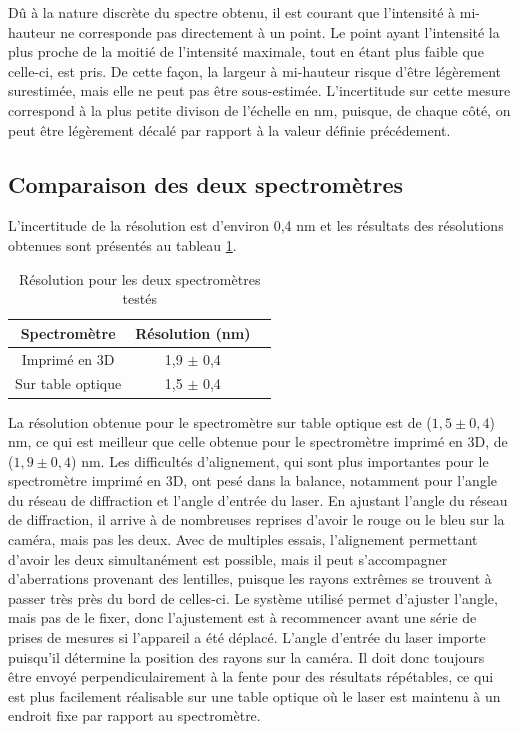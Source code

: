 \documentclass[11pt,letterpaper]{article}
\begin{document}
Dû à la nature discrète du spectre obtenu, il est courant que l'intensité à 
mi-hauteur ne corresponde pas directement à un point. Le point ayant l'intensité la plus proche
de la moitié de l'intensité maximale, tout en étant plus faible que celle-ci, est pris. De
cette façon, la largeur à mi-hauteur risque d'être légèrement surestimée, mais elle ne peut pas
être sous-estimée. L'incertitude sur cette mesure correspond à la plus petite divison de l'échelle en nm,
puisque, de chaque côté, on peut être légèrement décalé par rapport à la valeur définie précédement.

\subsection{Comparaison des deux spectromètres}

L'incertitude de la résolution est d'environ 0,4 nm et les résultats des résolutions 
obtenues sont présentés au tableau \ref{res_tab}.

\begin{table}[H]
  \centering
  \begin{tabular}{|c|c|c|}\hline
    Spectromètre & Résolution (nm) \\
    \hline
    Imprimé en 3D & 1,9 $\pm$ 0,4\\    \hline
    Sur table optique & 1,5 $\pm$ 0,4\\    \hline
  \end{tabular}
  \caption{Résolution pour les deux spectromètres testés}
  \label{res_tab}
\end{table}

La résolution obtenue pour le spectromètre sur table optique est de ($1,5 \pm 0,4$) nm, ce qui
est meilleur que celle obtenue pour le spectromètre imprimé en 3D, de ($1,9 \pm 0,4$) nm. Les difficultés d'alignement, qui sont plus importantes pour le spectromètre imprimé en 3D, ont
pesé dans la balance, notamment pour l'angle du réseau de diffraction et l'angle d'entrée du laser. 
En ajustant l'angle du réseau de diffraction, il arrive à de nombreuses reprises d'avoir 
le rouge ou le bleu sur la caméra, mais pas les deux.
Avec de multiples essais, l'alignement permettant d'avoir les deux simultanément est possible,
mais il peut s'accompagner d'aberrations provenant des lentilles, puisque les rayons extrêmes
se trouvent à passer très près du bord de celles-ci. Le système utilisé permet d'ajuster l'angle,
mais pas de le fixer, donc l'ajustement est à recommencer avant une série de prises de mesures si
l'appareil a été déplacé. 
L'angle d'entrée du laser importe puisqu'il détermine la position des rayons sur la caméra. Il doit
donc toujours être envoyé perpendiculairement à la fente pour des résultats répétables, ce qui est
plus facilement réalisable sur une table optique où le laser est maintenu à un endroit fixe par 
rapport au spectromètre.  
\end{document}
